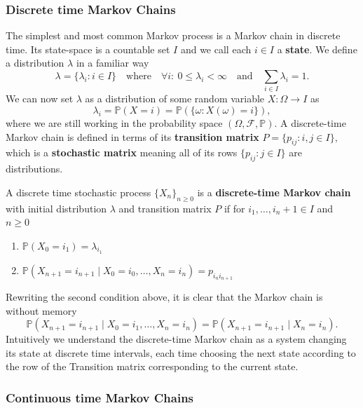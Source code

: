 \subsubsection{Discrete time Markov Chains}
The simplest and most common Markov process is a Markov chain in discrete time. Its state-space is a countable set $I$ and we call each $i \in I$ a \textbf{state}. We define a distribution $\lambda$ in a familiar way
\begin{equation}
	\lambda = \{\lambda_i : i \in I\} \quad \text{where} \quad \forall i:~ 0 \leq \lambda_i < \infty \quad \text{and} \quad \sum_{i \in I} \lambda_i = 1.
\end{equation}
We can now set $\lambda$ as a distribution of some random variable $X:\Omega \rightarrow I$ as
\begin{equation}
	\lambda_{i}=\mathbb{P}(X=i)=\mathbb{P}(\{\omega: X(\omega)=i\}),
\end{equation}
where we are still working in the probability space $(\Omega, \mathcal{F}, \mathbb{P})$. A discrete-time Markov chain is defined in terms of its \textbf{transition matrix} $P=\{p_{i j}: i, j \in I\}$, which is a \textbf{stochastic matrix} meaning all of its rows $\{p_{i j}: j \in I\}$ are distributions.
\begin{definition}
	A discrete time stochastic process $\{X_n\}_{n \geq 0}$ is a \textbf{discrete-time Markov chain} with initial distribution $\lambda$ and transition matrix $P$ if for $i_1, \dots, i_n+1 \in I$ and $n \geq 0$
	\begin{enumerate}[label=\roman*]
		\item $\mathbb{P}\left(X_{0}=i_{1}\right)=\lambda_{i_{1}}$
		\item $\mathbb{P}\left(X_{n+1}=i_{n+1} \mid X_{0}=i_{0}, \dots, X_{n}=i_{n}\right)=p_{i_{n} i_{n+1}}$
	\end{enumerate}
\end{definition}
Rewriting the second condition above, it is clear that the Markov chain is without memory
\begin{equation}
	\mathbb{P}\left(X_{n+1}=i_{n+1} \mid X_{0}=i_{1}, \dots, X_{n}=i_{n}\right)=\mathbb{P}(X_{n+1} = i_{n+1} \mid X_{n} = i_{n}).
\end{equation}
Intuitively we understand the discrete-time Markov chain as a system changing its state at discrete time intervals, each time choosing the next state according to the row of the Transition matrix corresponding to the current state.

\subsubsection{Continuous time Markov Chains}




